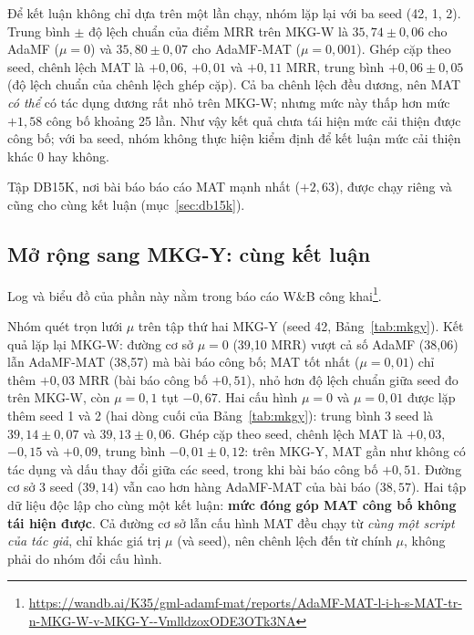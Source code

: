 \documentclass[conference]{IEEEtran}
\renewcommand{\hl}[1]{#1}
\begin{document}
Để kết luận không chỉ dựa trên một lần chạy, nhóm lặp lại với ba seed (42, 1, 2).
Trung bình $\pm$ độ lệch chuẩn của điểm MRR trên MKG-W là $35{,}74 \pm 0{,}06$ cho AdaMF ($\mu=0$)
và $35{,}80 \pm 0{,}07$ cho AdaMF-MAT ($\mu=0{,}001$). Ghép cặp theo seed, chênh lệch MAT là
$+0{,}06$, $+0{,}01$ và $+0{,}11$ MRR, trung bình $+0{,}06 \pm 0{,}05$ (độ lệch chuẩn của chênh lệch
ghép cặp). Cả ba chênh lệch đều dương, nên \hl{MAT} \emph{có thể} có tác dụng dương rất nhỏ
trên MKG-W; nhưng mức này thấp hơn mức $+1{,}58$ công bố khoảng 25 lần. Như vậy kết quả chưa tái hiện
mức cải thiện được công bố; với ba seed, nhóm không thực hiện kiểm định để kết luận mức cải thiện khác
0 hay không.

Tập DB15K, nơi bài báo báo cáo MAT mạnh nhất ($+2{,}63$), được chạy riêng và cũng cho
cùng kết luận (mục~\ref{sec:db15k}).

\subsection{Mở rộng sang MKG-Y: cùng kết luận}
\noindent Log và biểu đồ của phần này nằm trong báo cáo W\&B công khai\footnote{\url{https://wandb.ai/K35/gml-adamf-mat/reports/AdaMF-MAT-l-i-h-s-MAT-tr-n-MKG-W-v-MKG-Y--VmlldzoxODE3OTk3NA}}.

Nhóm quét trọn lưới $\mu$ trên tập thứ hai MKG-Y (seed 42, Bảng~\ref{tab:mkgy}).
Kết quả lặp lại MKG-W: đường cơ sở $\mu=0$ (39,10 MRR) vượt cả số AdaMF (38,06) lẫn
AdaMF-MAT (38,57) mà bài báo công bố; MAT tốt nhất ($\mu=0{,}01$) chỉ thêm $+0{,}03$
MRR (bài báo công bố $+0{,}51$), nhỏ hơn độ lệch chuẩn giữa seed đo trên MKG-W, còn $\mu=0{,}1$ tụt
$-0{,}67$. Hai cấu hình $\mu=0$ và $\mu=0{,}01$ được lặp thêm seed 1 và 2 (hai dòng cuối của
Bảng~\ref{tab:mkgy}): trung bình 3 seed là $39{,}14 \pm 0{,}07$ và $39{,}13 \pm 0{,}06$. Ghép cặp theo
seed, chênh lệch MAT là $+0{,}03$, $-0{,}15$ và $+0{,}09$, trung bình $-0{,}01 \pm 0{,}12$: trên MKG-Y,
MAT gần như không có tác dụng và dấu thay đổi giữa các seed, trong khi bài báo công bố $+0{,}51$.
Đường cơ sở 3 seed ($39{,}14$) vẫn cao hơn hàng AdaMF-MAT của bài báo ($38{,}57$). Hai tập
dữ liệu độc lập cho cùng một kết luận: \textbf{mức đóng góp MAT công bố không tái hiện được}. Cả đường
cơ sở lẫn cấu hình MAT đều chạy từ \emph{cùng một script của tác giả}, chỉ khác giá trị $\mu$ (và seed),
nên chênh lệch đến từ chính $\mu$, không phải do nhóm đổi cấu hình.
\end{document}
